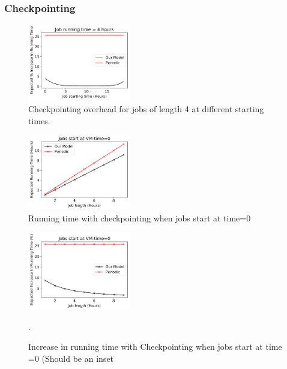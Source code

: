 \subsubsection{Checkpointing}
\label{subsec:eval-ckpt}


\begin{figure}[t]
  \includegraphics[width=0.4\textwidth]{../graphs/ckpt-4.pdf}
  \caption{Checkpointing overhead for jobs of length 4 at different starting times.}
  \label{fig:ckpt-4}
\end{figure}

\begin{figure}
  \includegraphics[width=0.4\textwidth]{../graphs/ckpt-start-0.pdf}
  \caption{Running time with checkpointing when jobs start at time=0}
  \label{fig:ckpt-start-0}
\end{figure}


\begin{figure}
  \includegraphics[width=0.4\textwidth]{../graphs/ckpt-start-relative.pdf}
  \caption{Increase in running time with Checkpointing when jobs start at time =0 (Should be an inset}.
  \label{fig:ckpt-start-0-relative}
\end{figure}



